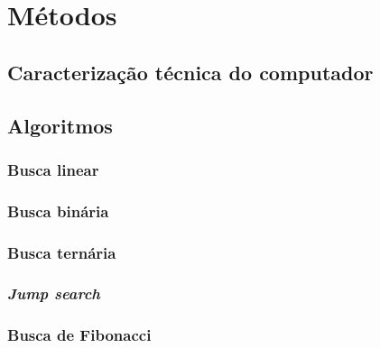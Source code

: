 \chapter{Métodos}




\section{Caracterização técnica do computador}



\section{Algoritmos}


\subsection{Busca linear}

\subsection{Busca binária}

\subsection{Busca ternária}

\subsection{{\it Jump search}}

\subsection{Busca de Fibonacci}

